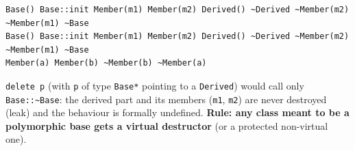 \documentclass[10pt,a4paper,openany,oneside]{report}
\begin{document}
\begin{lstlisting}[style=out,title={Answer: captured output}]
Base() Base::init Member(m1) Member(m2) Derived() ~Derived ~Member(m2) ~Member(m1) ~Base 
Base() Base::init Member(m1) Member(m2) Derived() ~Derived ~Member(m2) ~Member(m1) ~Base 
Member(a) Member(b) ~Member(b) ~Member(a) 
\end{lstlisting}
\begin{trapbox}
\texttt{delete p} (with \texttt{p} of type \texttt{Base*} pointing to a \texttt{Derived}) would call only \texttt{Base::\textasciitilde{}Base}: the derived part and its members (\texttt{m1}, \texttt{m2}) are never destroyed (leak) and the behaviour is formally undefined. \textbf{Rule: any class meant to be a polymorphic base gets a virtual destructor} (or a protected non-virtual one).
\end{trapbox}
\end{document}
